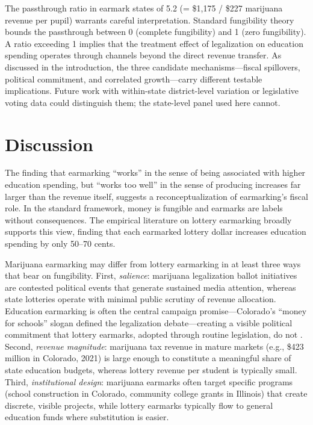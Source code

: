 \documentclass[12pt]{article}
\begin{document}
The passthrough ratio in earmark states of 5.2 (= \$1,175 / \$227 marijuana revenue per pupil) warrants careful interpretation. Standard fungibility theory bounds the passthrough between 0 (complete fungibility) and 1 (zero fungibility). A ratio exceeding 1 implies that the treatment effect of legalization on education spending operates through channels beyond the direct revenue transfer. As discussed in the introduction, the three candidate mechanisms---fiscal spillovers, political commitment, and correlated growth---carry different testable implications. Future work with within-state district-level variation or legislative voting data could distinguish them; the state-level panel used here cannot.


\section{Discussion}

The finding that earmarking ``works'' in the sense of being associated with higher education spending, but ``works too well'' in the sense of producing increases far larger than the revenue itself, suggests a reconceptualization of earmarking's fiscal role. In the standard \citet{hines1995anomalies} framework, money is fungible and earmarks are labels without consequences. The empirical literature on lottery earmarking \citep{evans2007earmarking, borg1990earmarking} broadly supports this view, finding that each earmarked lottery dollar increases education spending by only 50--70 cents.

Marijuana earmarking may differ from lottery earmarking in at least three ways that bear on fungibility. First, \textit{salience}: marijuana legalization ballot initiatives are contested political events that generate sustained media attention, whereas state lotteries operate with minimal public scrutiny of revenue allocation. Education earmarking is often the central campaign promise---Colorado's ``money for schools'' slogan defined the legalization debate---creating a visible political commitment that lottery earmarks, adopted through routine legislation, do not \citep{brunner2004earmarking}. Second, \textit{revenue magnitude}: marijuana tax revenue in mature markets (e.g., \$423 million in Colorado, 2021) is large enough to constitute a meaningful share of state education budgets, whereas lottery revenue per student is typically small. Third, \textit{institutional design}: marijuana earmarks often target specific programs (school construction in Colorado, community college grants in Illinois) that create discrete, visible projects, while lottery earmarks typically flow to general education funds where substitution is easier.
\end{document}

